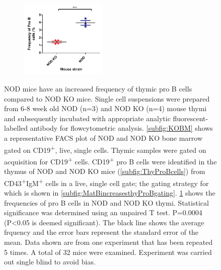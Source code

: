 \begin{figure}
	\begin{subfigure}{\textwidth}
	\caption{}
	\includegraphics[width=0.45\textwidth]{Figures/ProBNODKO.pdf}
	\label{subfig:MatureBincproBgraph}
	\end{subfigure}
\caption[NOD mice have an increased frequency of thymic pro B cells compared to NOD KO mice]{NOD mice have an increased frequency of thymic pro B cells compared to NOD KO mice.
Single cell suspensions were prepared from 6-8 week old NOD (n=3) and NOD KO (n=4) mouse thymi and subsequently incubated with appropriate analytic fluorescent-labelled antibody for flowcytometric analysis.
\ref{subfig:KOBM} shows a representative FACS plot of NOD and NOD KO bone marrow gated on CD19\textsuperscript{+}, live, single cells.
Thymic samples were gated on acquisition for CD19\textsuperscript{+} cells.
CD19\textsuperscript{+} pro B cells were identified in the thymus of NOD and NOD KO mice (\ref{subfig:ThyProBcells}) from CD43\textsuperscript{+}IgM\textsuperscript{+} cells in a live, single cell gate; the gating strategy for which is shown in \ref{subfig:MatBincreasesthyProBgating}.
\ref{subfig:MatureBincproBgraph} shows the frequencies of pro B cells in NOD and NOD KO thymi.
Statistical significance was determined using an unpaired T test. P=0.0004 (P<0.05 is deemed significant). The black line shows the average frquency and the error bars represent the standard error of the mean.
Data shown are from one experiment that has been repeated 5 times. A total of 32 mice were examined.
Experiment was carried out single blind to avoid bias.}
\label{fig:MatureBincProB}
\end{figure}




